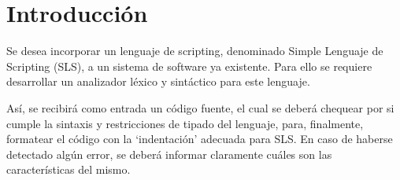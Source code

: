 \section*{Introducción}

Se desea incorporar un lenguaje de scripting, denominado Simple Lenguaje de Scripting (SLS), a
un sistema de software ya existente. Para ello se requiere desarrollar un analizador léxico y sintáctico
para este lenguaje.

Así, se recibirá como entrada un código fuente, el cual se deberá chequear por si cumple la sintaxis y
restricciones de tipado del lenguaje, para, finalmente, formatear el código con la ‘indentación’ adecuada
para SLS. En caso de haberse detectado algún error, se deberá informar claramente cuáles son las
características del mismo.

